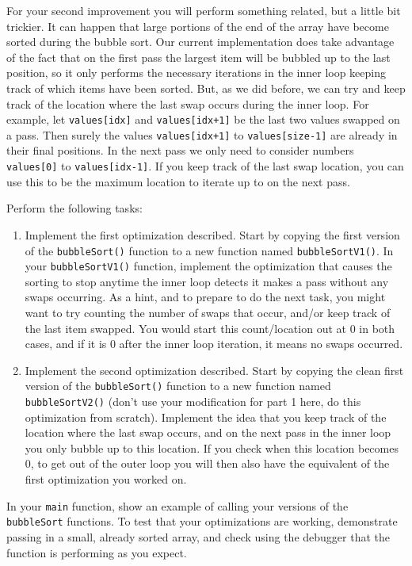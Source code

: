 \documentclass[11pt]{article}
\begin{document}
For your second improvement you will perform something related, but a
little bit trickier.  It can happen that large portions of the end of
the array have become sorted during the bubble sort.  Our current
implementation does take advantage of the fact that on the first pass
the largest item will be bubbled up to the last position, so it only
performs the necessary iterations in the inner loop keeping track of
which items have been sorted.  But, as we did before, we can try and
keep track of the location where the last swap occurs during the inner
loop.  For example, let \verb~values[idx]~ and \verb~values[idx+1]~ be the 
last two values swapped on a pass.  Then surely the values
\verb~values[idx+1]~ to \verb~values[size-1]~ are already in their final
positions.  In the next pass we only need to consider numbers
\verb~values[0]~ to \verb~values[idx-1]~.  If you keep track of the last
swap location, you can use this to be the maximum location to
iterate up to on the next pass.

Perform the following tasks:

\begin{enumerate}
\item Implement the first optimization described.  Start by copying the
   first version of the \verb~bubbleSort()~ function to a new function
   named \verb~bubbleSortV1()~.  In your \verb~bubbleSortV1()~ function, implement
   the optimization that causes the sorting to stop anytime the inner
   loop detects it makes a pass without any swaps occurring.  As a
   hint, and to prepare to do the next task, you might want to try
   counting the number of swaps that occur, and/or keep track of the
   last item swapped.  You would start this count/location out at 0 in
   both cases, and if it is 0 after the inner loop iteration, it means
   no swaps occurred.
\item Implement the second optimization described.  Start by copying the
   clean first version of the \verb~bubbleSort()~ function to a new
   function named \verb~bubbleSortV2()~ (don't use your modification for
   part 1 here, do this optimization from scratch).  Implement the
   idea that you keep track of the location where the last swap
   occurs, and on the next pass in the inner loop you only bubble up
   to this location.  If you check when this location becomes 0, to
   get out of the outer loop you will then also have the equivalent of
   the first optimization you worked on.
\end{enumerate}

In your \verb~main~ function, show an example of calling your versions of
the \verb~bubbleSort~ functions.  To test that your optimizations are
working, demonstrate passing in a small, already sorted array, and
check using the debugger that the function is performing as you
expect.
\end{document}
